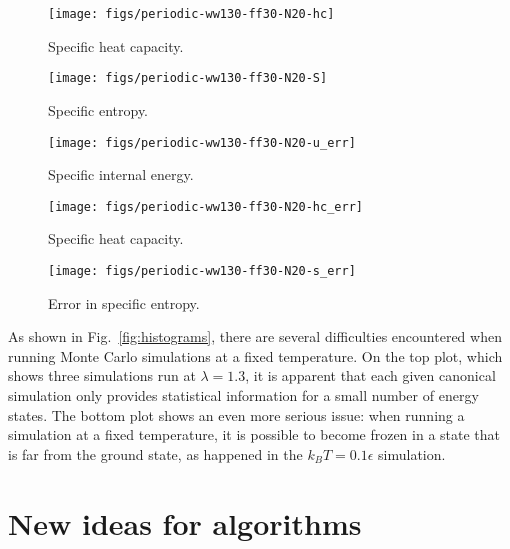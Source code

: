 \documentclass[letterpaper,twocolumn,amsmath,amssymb,pre,aps,10pt]{revtex4-1}
\begin{document}
\begin{figure}
  \texttt{[image: figs/periodic-ww130-ff30-N20-hc]}
  \caption{Specific heat capacity.\label{fig:hc}}
\end{figure}

\begin{figure}
  \texttt{[image: figs/periodic-ww130-ff30-N20-S]}
  \caption{Specific entropy.\label{fig:S}}
\end{figure}

\begin{figure}
  \texttt{[image: figs/periodic-ww130-ff30-N20-u\_err]}
  \caption{Specific internal energy.\label{fig:u}}
\end{figure}

\begin{figure}
  \texttt{[image: figs/periodic-ww130-ff30-N20-hc\_err]}
  \caption{Specific heat capacity.\label{fig:hc}}
\end{figure}

\begin{figure}
  \texttt{[image: figs/periodic-ww130-ff30-N20-s\_err]}
  \caption{Error in specific entropy.\label{fig:Serr}}
\end{figure}


As shown in Fig.~\ref{fig:histograms}, there are several difficulties
encountered when running Monte Carlo simulations at a fixed
temperature.  On the top plot, which shows three simulations run at
$\lambda = 1.3$, it is apparent that each given canonical simulation
only provides statistical information for a small number of energy
states.  The bottom plot shows an even more serious issue: when
running a simulation at a fixed temperature, it is possible to become
frozen in a state that is far from the ground state, as happened in
the $k_{B}T=0.1\epsilon$ simulation.

% 

\section{New ideas for algorithms}
\end{document}
